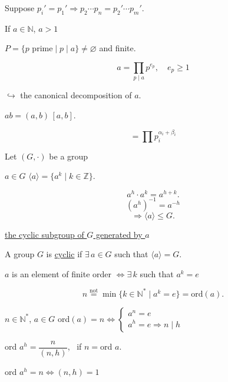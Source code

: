 \documentclass[12pt]{article}
\begin{document}
\noindent Suppose $p_i'=p_1' \Rightarrow p_2\cdots p_n = p_2'\cdots p_m'$.

\bigskip
\noindent If $a\in\mathbb{N}$, $a>1$

\noindent $P=\{p \text{ prime} \mid p\mid a\} \neq \varnothing$ and finite.

\[
a = \prod_{p\mid a} p^{e_p}, \quad e_p\geq 1
\]

\noindent $\hookrightarrow$ the canonical decomposition of $a$.

\bigskip
\noindent\underline{\phantom{xx}}

\noindent $ab = (a,b)\,[a,b]$.

\[
= \prod p_i^{\alpha_i+\beta_i}
\]

\bigskip
\noindent Let $(G,\cdot)$ be a group

\noindent $a\in G$ \quad $\langle a\rangle = \{a^k \mid k\in\mathbb{Z}\}$.

\[
a^h\cdot a^k = a^{h+k}.
\]
\[
(a^h)^{-1} = a^{-h}
\]
\[
\Rightarrow \langle a\rangle \leq G.
\]

\noindent\underline{the cyclic subgroup of $G$ generated by $a$}

\bigskip
\noindent A group $G$ is \underline{cyclic} if $\exists\,a\in G$ such that $\langle a\rangle = G$.

\bigskip
\noindent $a$ is an element of finite order $\Leftrightarrow \exists\,k$ such that $a^k=e$

\[
n \overset{\text{not}}{=} \min\{k\in\mathbb{N}^* \mid a^k=e\} = \text{ord}(a).
\]

\bigskip
\noindent $n\in\mathbb{N}^*$, $a\in G$ \qquad ord$(a)=n \Leftrightarrow \begin{cases}a^n=e\\ a^h=e \Rightarrow n\mid h\end{cases}$

\bigskip
\noindent ord $a^h = \dfrac{n}{(n,h)}$, \ if $n=$ord $a$.

\bigskip
\noindent ord $a^h = n \Leftrightarrow (n,h)=1$
\end{document}
